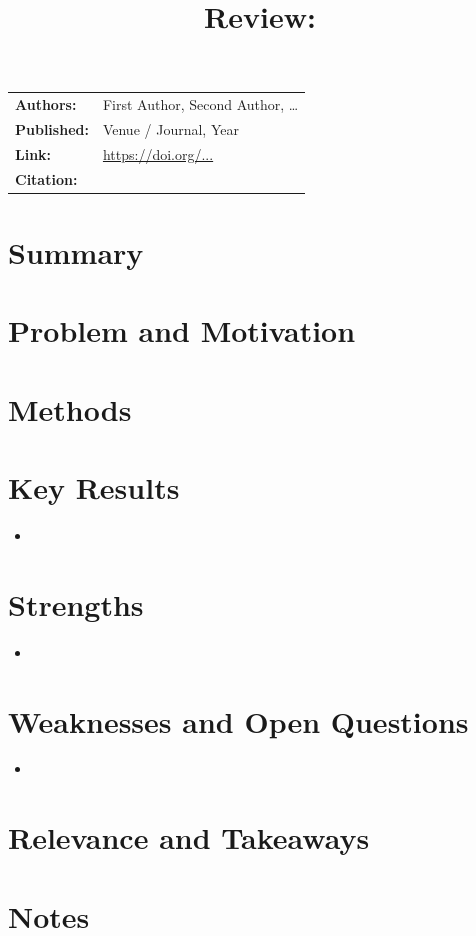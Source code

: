 \documentclass[11pt]{article}
\title{Review: \papertitle}
\author{}
\date{\reviewdate}
\newcommand{\paperauthors}{First Author, Second Author, \ldots}
\newcommand{\papervenue}{Venue / Journal, Year}
\newcommand{\paperlink}{\url{https://doi.org/...}}
\newcommand{\paperkey}{author2024example} %
\begin{document}
\maketitle

\begin{tabular}{@{}ll@{}}
  \textbf{Authors:} & \paperauthors \\
  \textbf{Published:} & \papervenue \\
  \textbf{Link:} & \paperlink \\
  \textbf{Citation:} & \cite{\paperkey} \\
\end{tabular}

\section{Summary}

\section{Problem and Motivation}

\section{Methods}

\section{Key Results}
\begin{itemize}
  \item
\end{itemize}

\section{Strengths}
\begin{itemize}
  \item
\end{itemize}

\section{Weaknesses and Open Questions}
\begin{itemize}
  \item
\end{itemize}

\section{Relevance and Takeaways}

\section{Notes}



\end{document}
